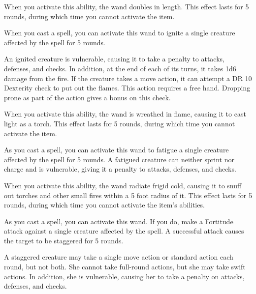         When you activate this ability, the wand doubles in length.
        This effect lasts for 5 rounds, during which time you cannot activate the item.


         When you cast a spell, you can activate this wand to ignite a single creature affected by the spell for 5 rounds.

        An ignited creature is vulnerable, causing it to take a  penalty to attacks, defenses, and checks.
        In addition, at the end of each of its turns, it takes 1d6 damage from the fire.
        If the creature takes a move action, it can attempt a DR 10 Dexterity check to put out the flames.
        This action requires a free hand.
        Dropping prone as part of the action gives a  bonus on this check.

        When you activate this ability, the wand is wreathed in flame, causing it to cast light as a torch.
        This effect lasts for 5 rounds, during which time you cannot activate the item.


         As you cast a spell, you can activate this wand to fatigue a single creature affected by the spell for 5 rounds.
        A fatigued creature can neither sprint nor charge and is vulnerable, giving it a  penalty to attacks, defenses, and checks.

        When you activate this ability, the wand radiate frigid cold, causing it to snuff out torches and other small fires within a 5 foot radius of it.
        This effect lasts for 5 rounds, during which time you cannot activate the item's abilities.


         As you cast a spell, you can activate this wand.
        If you do, make a Fortitude attack against a single creature affected by the spell.
        A successful attack causes the target to be staggered for 5 rounds.

        A staggered creature may take a single move action or standard action each round, but not both.
        She cannot take full-round actions, but she may take swift actions.
        In addition, she is vulnerable, causing her to take a  penalty on attacks, defenses, and checks.

